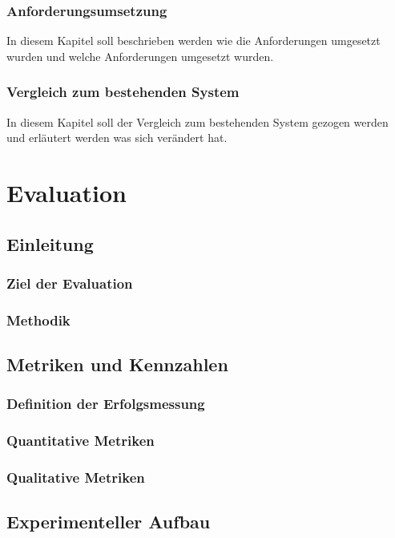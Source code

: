 \documentclass[a4paper,10pt,twoside]{report}
\begin{document}
\subsection{Anforderungsumsetzung}
In diesem Kapitel soll beschrieben werden wie die Anforderungen umgesetzt wurden und welche Anforderungen umgesetzt wurden.
\subsection{Vergleich zum bestehenden System}
In diesem Kapitel soll der Vergleich zum bestehenden System gezogen werden und erläutert werden was sich verändert hat.



\chapter{Evaluation}

\section{Einleitung}
\subsection{Ziel der Evaluation}
\subsection{Methodik}

\section{Metriken und Kennzahlen}
\subsection{Definition der Erfolgsmessung}
\subsection{Quantitative Metriken}
\subsection{Qualitative Metriken}

\section{Experimenteller Aufbau}
\end{document}
